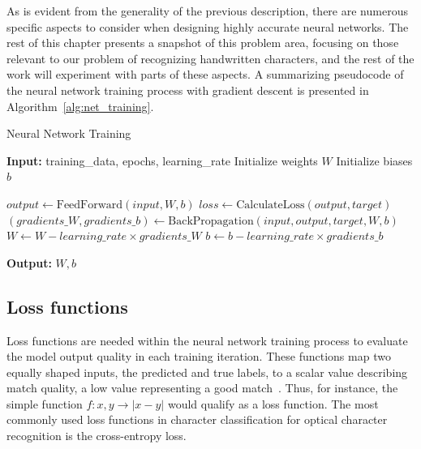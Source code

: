 \documentclass[english,twoside,openright]{UH_DS_MSc}
\begin{document}
As is evident from the generality of the previous description, there are numerous 
specific aspects to consider when designing highly accurate neural networks. The 
rest of this chapter presents a snapshot of this problem area, focusing on those 
relevant to our problem of recognizing handwritten characters, and the rest of the 
work will experiment with parts of these aspects. A summarizing pseudocode of the 
neural network training process with gradient descent is presented in Algorithm~\ref{alg:net_training}.

\begin{algorithm}
    \caption{Neural Network Training}
    \begin{algorithmic}[1]
        \State \textbf{Input:} training\_data, epochs, learning\_rate
        \State Initialize weights $W$
        \State Initialize biases $b$
        
                \State $output \gets \text{FeedForward}(input, W, b)$
                \State $loss \gets \text{CalculateLoss}(output, target)$
                \State $(gradients\_W, gradients\_b) \gets \text{BackPropagation}(input, output, target, W, b)$
                \State $W \gets W - learning\_rate \times gradients\_W$
                \State $b \gets b - learning\_rate \times gradients\_b$
            \EndFor
        \EndFor
        
        \State \textbf{Output:} $W, b$  
    \end{algorithmic}
    \label{alg:net_training}
\end{algorithm}

\subsection{Loss functions}
\label{sect:loss_funcs}

Loss functions are needed within the neural network training process to evaluate the model output 
quality in each training iteration. These functions map two equally shaped inputs, the predicted 
and true labels, to a scalar value describing match quality, a low value representing a good match~\cite{princebook}. 
Thus, for instance, the simple function $f: x,y \rightarrow |x-y|$  would qualify as a loss function.
The most commonly used loss functions in character classification for optical character recognition is 
the cross-entropy loss.
\end{document}
